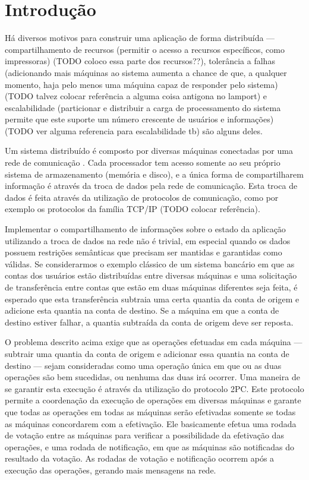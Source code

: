 \documentclass[11pt,twoside,a4paper]{book}
\begin{document}
\mainmatter

\fancyhead[RE,LO]{\thesection}

\singlespacing              %

\chapter{Introdução}
\label{chap:introducao}
Há diversos motivos para construir uma aplicação de forma distribuída --- compartilhamento de recursos (permitir o acesso a recursos específicos, como impressoras) (TODO coloco essa parte dos recursos??), tolerância a falhas (adicionando mais máquinas ao sistema aumenta a chance de que, a qualquer momento, haja pelo menos uma máquina capaz de responder pelo sistema) (TODO talvez colocar referência a alguma coisa antigona no lamport) e escalabilidade (particionar e distribuir a carga de processamento do sistema permite que este suporte um número crescente de usuários e informações) (TODO ver alguma referencia para escalabilidade tb) são alguns deles.

Um sistema distribuído é composto por diversas máquinas conectadas por uma rede de comunicação \cite{tanenbaum}. Cada processador tem acesso somente ao seu próprio sistema de armazenamento (memória e disco), e a única forma de compartilharem informação é através da troca de dados pela rede de comunicação. Esta troca de dados é feita através da utilização de protocolos de comunicação, como por exemplo os protocolos da família TCP/IP (TODO colocar referência).

Implementar o compartilhamento de informações sobre o estado da aplicação utilizando a troca de dados na rede não é trivial, em especial quando os dados possuem restrições semânticas que precisam ser mantidas e garantidas como válidas. Se considerarmos o exemplo clássico de um sistema bancário em que as contas dos usuários estão distribuídas entre diversas máquinas e uma solicitação de transferência entre contas que estão em duas máquinas diferentes seja feita, é esperado que esta transferência subtraia uma certa quantia da conta de origem e adicione esta quantia na conta de destino. Se a máquina em que a conta de destino estiver falhar, a quantia subtraída da conta de origem deve ser reposta.

O problema descrito acima exige que as operações efetuadas em cada máquina --- subtrair uma quantia da conta de origem e adicionar essa quantia na conta de destino --- sejam consideradas como uma operação única em que ou as duas operações são bem sucedidas, ou nenhuma das duas irá ocorrer. Uma maneira de se garantir esta execução é através da utilização do protocolo 2PC. Este protocolo permite a coordenação da execução de operações em diversas máquinas e garante que todas as operações em todas as máquinas serão efetivadas somente se todas as máquinas concordarem com a efetivação. Ele basicamente efetua uma rodada de votação entre as máquinas para verificar a possibilidade da efetivação das operações, e uma rodada de notificação, em que as máquinas são notificadas do resultado da votação. As rodadas de votação e notificação ocorrem após a execução das operações, gerando mais mensagens na rede.
\end{document}
